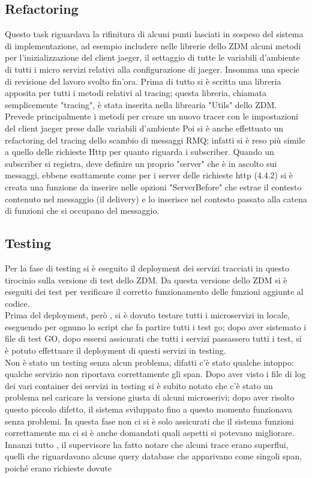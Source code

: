 \documentclass[a4paper,12pt,titlepage,italian,openany]{report}
\begin{document}
\subsection{Refactoring}
Questo task riguardava la rifinitura di alcuni punti lasciati in sospeso del sistema di implementazione, ad esempio includere nelle librerie dello ZDM\cite{zdm:1} alcuni metodi per l'inizializzazione del client jaeger, il settaggio di tutte le variabili d'ambiente di tutti i micro servizi relativi alla configurazione di jaeger.
Insomma una specie di revisione del lavoro svolto fin'ora.
Prima di tutto si è scritta una libreria apposita per tutti i metodi relativi al tracing; questa libreria, chiamata semplicemente "tracing", è stata inserita nella librearia "Utils" dello ZDM\cite{zdm:1}.
Prevede principalmente i metodi per creare un nuovo tracer con le impostazioni del client jaeger prese dalle variabili d'ambiente
Poi si è anche effettuato un refactoring del tracing dello scambio di messaggi RMQ; infatti si è reso più simile a quello delle richieste Http per quanto riguarda i subscriber. Quando un subscriber si registra, deve definire un proprio "server" che è in ascolto sui messaggi, ebbene esattamente come per i server delle richieste http (4.4.2) si
è creata una funzione da inserire nelle opzioni "ServerBefore" che estrae il contesto contenuto nel messaggio (il delivery) e lo inserisce nel contesto passato alla catena di funzioni che si occupano del messaggio.


\subsection{Testing}
Per la fase di testing si è eseguito il deployment dei servizi tracciati in questo tirocinio sulla versione di test dello ZDM\cite{zdm:1}. Da questa versione dello ZDM\cite{zdm:1} si è eseguiti dei test per verificare il corretto funzionamento delle funzioni aggiunte al codice.\\
Prima del deployment, però , si è dovuto testare tutti i microservizi in locale, eseguendo per ognuno lo script che fa partire tutti i test go; dopo aver sistemato i file di test GO, dopo essersi assicurati che tutti i servizi passassero tutti i test, si è potuto effettuare il deployment di questi servizi in testing.\\ 
Non è stato un testing senza alcun problema, difatti c'è stato qualche intoppo: qualche servizio non riportava correttamente gli span. 
Dopo aver visto i file di log dei vari container dei servizi in testing si è subito notato che c'è stato un problema nel caricare la versione giusta di alcuni microserivi; dopo aver risolto questo piccolo difetto, il sistema sviluppato fino a questo momento funzionava senza problemi.
In questa fase non ci si è solo assicurati che il sistema funzioni correttamente ma ci si è anche domandati quali aspetti si potevano migliorare. Innanzi tutto , il supervisore ha fatto notare che alcuni trace erano superflui, quelli che riguardavano alcune query database che apparivano come singoli span, poiché erano richieste dovute
\cite{opentracing:1}
\end{document}

